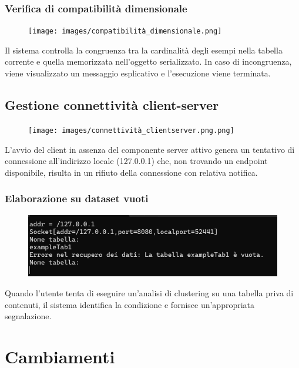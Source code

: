 \subsubsection{Verifica di compatibilità dimensionale} 
    \begin{figure}[h!]
        \centering
        \texttt{[image: images/compatibilità\_dimensionale.png]}
    \end{figure}
    Il sistema controlla la congruenza tra la cardinalità degli esempi nella tabella corrente e quella memorizzata nell'oggetto serializzato. In caso di incongruenza, viene visualizzato un messaggio esplicativo e l'esecuzione viene terminata.

\subsection{Gestione connettività client-server}
\begin{figure}[h!]
    \centering
    \texttt{[image: images/connettività\_clientserver.png.png]}
\end{figure}
L'avvio del client in assenza del componente server attivo genera un tentativo di connessione all'indirizzo locale (127.0.0.1) che, non trovando un endpoint disponibile, risulta in un rifiuto della connessione con relativa notifica.

\subsubsection{Elaborazione su dataset vuoti} 
    \begin{figure}[h!]
        \centering
        \includegraphics[width=\textwidth]{images/dataset_vuoti.png}
    \end{figure}

Quando l'utente tenta di eseguire un'analisi di clustering su una tabella priva di contenuti, il sistema identifica la condizione e fornisce un'appropriata segnalazione.


\section{Cambiamenti}

